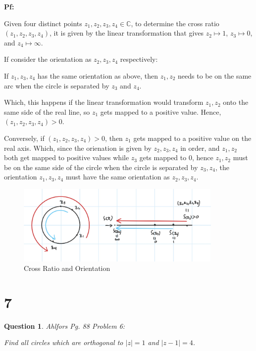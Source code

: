 \documentclass{article}
\newtheorem{question}{Question}
\begin{document}
\textbf{Pf:}

Given four distinct points $z_1,z_2,z_3,z_4\in\mathbb{C}$, to determine the cross ratio $(z_1,z_2,z_3,z_4)$, it is given by the linear transformation
that gives $z_2\mapsto 1$, $z_3\mapsto 0$, and $z_4\mapsto \infty$.

If consider the orientation as $z_2,z_3,z_4$ respectively:

If $z_1,z_3,z_4$ has the same orientation as above, then $z_1,z_2$ needs to be on the same arc when the circle is separated by $z_3$ and $z_4$.

Which, this happens if the linear transformation would transform $z_1,z_2$ onto the same side of the real line, so $z_1$ gets mapped to a positive value.
Hence, $(z_1,z_2,z_3,z_4)>0$.

\hfill

Conversely, if $(z_1,z_2,z_3,z_4)>0$, then $z_1$ gets mapped to a positive value on the real axis.
Which, since the orienation is given by $z_2,z_3,z_4$ in order, and $z_1,z_2$ both get mapped to positive values while $z_3$ gets mapped to $0$,
hence $z_1,z_2$ must be on the same side of the circle when the circle is separated by $z_3,z_4$, the orientation $z_1,z_3,z_4$ must have the same orientation as $z_2,z_3,z_4$.

\hfill

\begin{figure}[h!]
    \begin{center}
        \includegraphics*[width=100mm]{Cross Ratio and Orientation.jpg}
        \caption{Cross Ratio and Orientation}
    \end{center}
\end{figure}

\break

\section*{7}
\begin{myBox}[]{}
    \begin{question}
       Ahlfors Pg. 88 Problem 6:

       Find all circles which are orthogonal to $|z|=1$ and $|z-1|=4$.
    \end{question}
\end{myBox}
\end{document}
